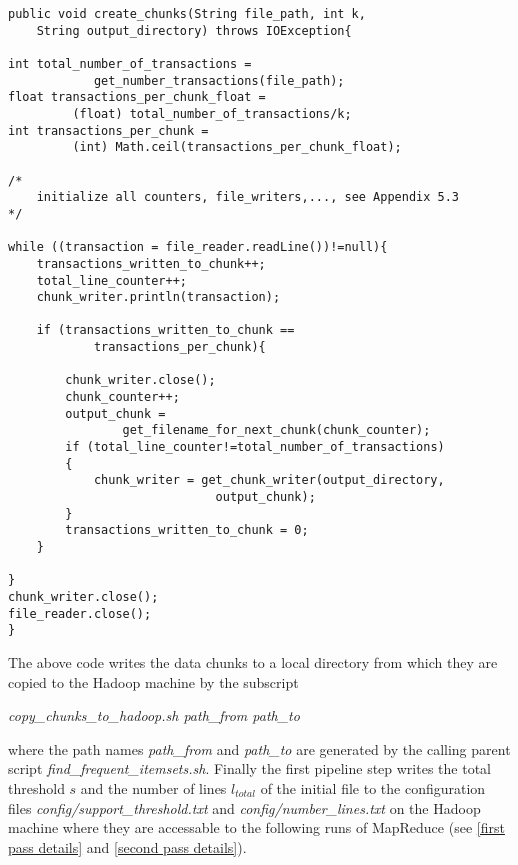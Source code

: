 \begin{lstlisting}[caption={writing the data chunks},captionpos=b,label={lst:create chunks}]
public void create_chunks(String file_path, int k,
	String output_directory) throws IOException{
	
int total_number_of_transactions =
			get_number_transactions(file_path);
float transactions_per_chunk_float =
		 (float) total_number_of_transactions/k;
int transactions_per_chunk =
		 (int) Math.ceil(transactions_per_chunk_float);
	
/*
	initialize all counters, file_writers,..., see Appendix 5.3
*/

while ((transaction = file_reader.readLine())!=null){
	transactions_written_to_chunk++;
	total_line_counter++;
	chunk_writer.println(transaction);
			
	if (transactions_written_to_chunk == 
			transactions_per_chunk){
			
		chunk_writer.close();
		chunk_counter++;
		output_chunk = 
				get_filename_for_next_chunk(chunk_counter);			
		if (total_line_counter!=total_number_of_transactions)
		{
			chunk_writer = get_chunk_writer(output_directory,
							 output_chunk);
		}
		transactions_written_to_chunk = 0;
	}
		
}
chunk_writer.close();
file_reader.close();	
}
\end{lstlisting}

The above code writes the data chunks to a local directory from which they are copied to the Hadoop machine by the subscript
\begin{center}
\textit{copy\_chunks\_to\_hadoop.sh path\_from path\_to}
\end{center} 
where the path names \textit{path\_from} and \textit{path\_to} are generated by the calling parent script
\textit{find\_frequent\_itemsets.sh}. Finally the first pipeline step writes the total threshold $s$ and the number of lines $l_{total}$ of the initial file to the configuration files \textit{config/support\_threshold.txt} and \textit{config/number\_lines.txt} on the Hadoop machine where they are accessable to the following runs of MapReduce (see \ref{first pass details} and \ref{second pass details}). 

